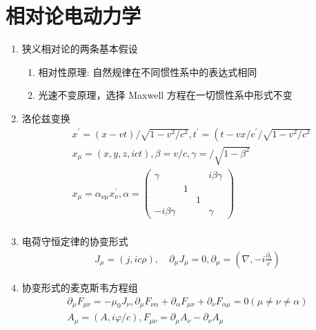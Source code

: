 \documentclass[../../note.tex]{subfiles}
\begin{document}
	\section{相对论电动力学}
	\begin{enumerate}
		\item 狭义相对论的两条基本假设
		\begin{enumerate}
			\item 相对性原理: 自然规律在不同惯性系中的表达式相同
			\item 光速不变原理，选择 Maxwell 方程在一切惯性系中形式不变 
		\end{enumerate}
		
			\item 洛伦兹变换
		\begin{align}
			& x^{\prime}=(x-v t) / \sqrt{1-v^2 / c^2}, t^{\prime}=\left(t-v x / c^{\prime} / \sqrt{1-v^2 / c^2}\right. \\
			& x_\mu=(x, y, z, i c t), \beta=v / c, \gamma=/ \sqrt{1-\beta^2} \\
			& x_\mu=\alpha_{\nu \mu} x_\nu^{\prime}, \alpha=\left(\begin{array}{cccc}
				\gamma & & & i \beta \gamma \\
				& 1 & & \\
				& & 1 & \\
				-i \beta \gamma & & & \gamma
			\end{array}\right) \\
			&
		\end{align}
		\item 电荷守恒定律的协变形式
	\begin{align}
		J_\mu=(j, i c \rho), \quad \partial_\mu J_\mu=0, \partial_\mu=\left(\nabla,-i \frac{\partial_t}{c}\right)
	\end{align}
			\item 协变形式的麦克斯韦方程组
		\begin{align}
			\partial_\mu F_{\mu \nu}=-\mu_0 J_\nu, \partial_\mu F_{\nu \alpha}+\partial_\alpha F_{\mu \nu}+\partial_\nu F_{\alpha \mu}=0(\mu \neq \nu \neq \alpha) \\
			A_\mu=(A, i \varphi / c), F_{\mu \nu}=\partial_\mu A_\nu-\partial_\nu A_\mu
		\end{align}
	\end{enumerate}
	
	
\end{document}
